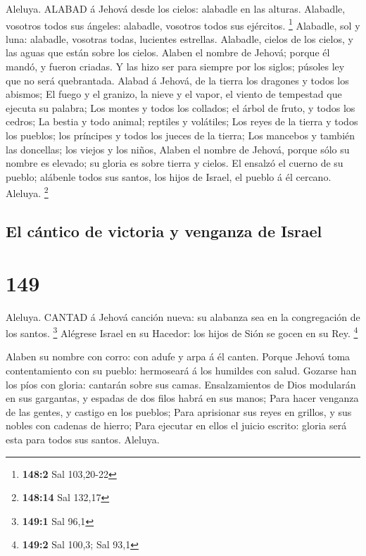  Aleluya. ALABAD á Jehová desde los cielos: alabadle en las
alturas.  Alabadle, vosotros todos sus ángeles: alabadle,
vosotros todos sus ejércitos. \footnote{\textbf{148:2} Sal 103,20-22}
 Alabadle, sol y luna: alabadle, vosotras todas, lucientes
estrellas.  Alabadle, cielos de los cielos, y las aguas que
están sobre los cielos.  Alaben el nombre de Jehová; porque
él mandó, y fueron criadas.  Y las hizo ser para siempre por
los siglos; púsoles ley que no será quebrantada.  Alabad á
Jehová, de la tierra los dragones y todos los abismos;  El
fuego y el granizo, la nieve y el vapor, el viento de tempestad que
ejecuta su palabra;  Los montes y todos los collados; el
árbol de fruto, y todos los cedros;  La bestia y todo
animal; reptiles y volátiles;  Los reyes de la tierra y
todos los pueblos; los príncipes y todos los jueces de la tierra;
 Los mancebos y también las doncellas; los viejos y los
niños,  Alaben el nombre de Jehová, porque sólo su nombre
es elevado; su gloria es sobre tierra y cielos.  El ensalzó
el cuerno de su pueblo; alábenle todos sus santos, los hijos de Israel,
el pueblo á él cercano. Aleluya. \footnote{\textbf{148:14} Sal 132,17}

\hypertarget{el-cuxe1ntico-de-victoria-y-venganza-de-israel}{%
\subsection{El cántico de victoria y venganza de
Israel}\label{el-cuxe1ntico-de-victoria-y-venganza-de-israel}}

\hypertarget{section-148}{%
\section{149}\label{section-148}}

 Aleluya. CANTAD á Jehová canción nueva: su alabanza sea en
la congregación de los santos. \footnote{\textbf{149:1} Sal 96,1}
 Alégrese Israel en su Hacedor: los hijos de Sión se gocen
en su Rey. \footnote{\textbf{149:2} Sal 100,3; Sal 93,1}

 Alaben su nombre con corro: con adufe y arpa á él canten.
 Porque Jehová toma contentamiento con su pueblo: hermoseará
á los humildes con salud.  Gozarse han los píos con gloria:
cantarán sobre sus camas.  Ensalzamientos de Dios modularán
en sus gargantas, y espadas de dos filos habrá en sus manos;
 Para hacer venganza de las gentes, y castigo en los
pueblos;  Para aprisionar sus reyes en grillos, y sus nobles
con cadenas de hierro;  Para ejecutar en ellos el juicio
escrito: gloria será esta para todos sus santos. Aleluya.

